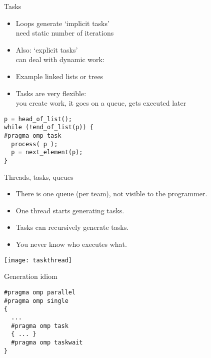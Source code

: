 
\begin{numberedframe}{Tasks}
  \begin{itemize}
  \item Loops generate `implicit tasks'\\
    need static number of iterations
  \item Also: `explicit tasks' \\
    can deal with dynamic work:
  \item 
    Example linked lists or trees
  \item Tasks are very flexible:\\
    you create work, it goes on a queue, gets executed later
  \end{itemize}
\begin{lstlisting}
p = head_of_list();
while (!end_of_list(p)) {
#pragma omp task
  process( p );
  p = next_element(p);
}
\end{lstlisting}
\end{numberedframe}

\begin{numberedframe}{Threads, tasks, queues}
  \begin{itemize}
  \item There is one queue (per team), not visible to the programmer.
  \item One thread starts generating tasks.
  \item Tasks can recursively generate tasks.
  \item You never know who executes what.
  \end{itemize}
  \texttt{[image: taskthread]}
\end{numberedframe}

\begin{numberedframe}{Generation idiom}
\begin{lstlisting}
#pragma omp parallel
#pragma omp single
{
  ...
  #pragma omp task
  { ... }
  #pragma omp taskwait
}
\end{lstlisting}
\end{numberedframe}

